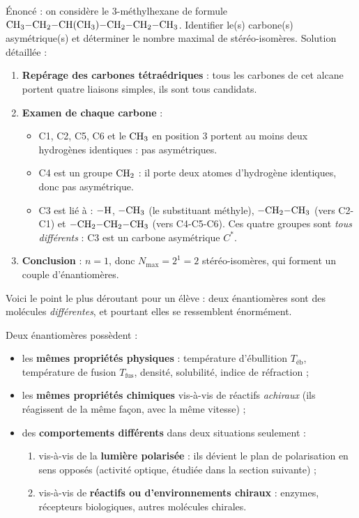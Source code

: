 \documentclass[11pt]{article}
\newcounter{popsec}
\newcounter{popsub}
\newcommand{\courssub}[1]{%
  \stepcounter{popsub}%
  \par\vspace{9pt}\noindent{\popxbold\fontsize{11.5}{13}\selectfont\color{popink}{\color{poporange}\thepopsec.\thepopsub}\hspace{6pt}#1}\par\nopagebreak\vspace{4pt}
}
\begin{document}
\begin{exoresolu}
Énoncé : on considère le 3-méthylhexane de formule $\ce{CH3-CH2-CH(CH3)-CH2-CH2-CH3}$. Identifier le(s) carbone(s) asymétrique(s) et déterminer le nombre maximal de stéréo-isomères.
\tcblower
Solution détaillée :
\begin{enumerate}
\item \textbf{Repérage des carbones tétraédriques} : tous les carbones de cet alcane portent quatre liaisons simples, ils sont tous candidats.
\item \textbf{Examen de chaque carbone} :
\begin{itemize}
\item C1, C2, C5, C6 et le $\ce{CH3}$ en position 3 portent au moins deux hydrogènes identiques : pas asymétriques.
\item C4 est un groupe $\ce{CH2}$ : il porte deux atomes d'hydrogène identiques, donc pas asymétrique.
\item C3 est lié à : $\ce{-H}$, $\ce{-CH3}$ (le substituant méthyle), $\ce{-CH2-CH3}$ (vers C2-C1) et $\ce{-CH2-CH2-CH3}$ (vers C4-C5-C6). Ces quatre groupes sont \emph{tous différents} : C3 est un carbone asymétrique $C^*$.
\end{itemize}
\item \textbf{Conclusion} : $n = 1$, donc $N_{\max} = 2^1 = 2$ stéréo-isomères, qui forment un couple d'énantiomères.
\end{enumerate}
\end{exoresolu}

\courssub{Propriétés des énantiomères}

Voici le point le plus déroutant pour un élève : deux énantiomères sont des molécules \emph{différentes}, et pourtant elles se ressemblent énormément.

\begin{propriete}
Deux énantiomères possèdent :
\begin{itemize}
\item les \textbf{mêmes propriétés physiques} : température d'ébullition $T_{\text{éb}}$, température de fusion $T_{\text{fus}}$, densité, solubilité, indice de réfraction ;
\item les \textbf{mêmes propriétés chimiques} vis-à-vis de réactifs \emph{achiraux} (ils réagissent de la même façon, avec la même vitesse) ;
\item des \textbf{comportements différents} dans deux situations seulement :
\begin{enumerate}
\item vis-à-vis de la \textbf{lumière polarisée} : ils dévient le plan de polarisation en sens opposés (activité optique, étudiée dans la section suivante) ;
\item vis-à-vis de \textbf{réactifs ou d'environnements chiraux} : enzymes, récepteurs biologiques, autres molécules chirales.
\end{enumerate}
\end{itemize}
\end{propriete}
\end{document}
